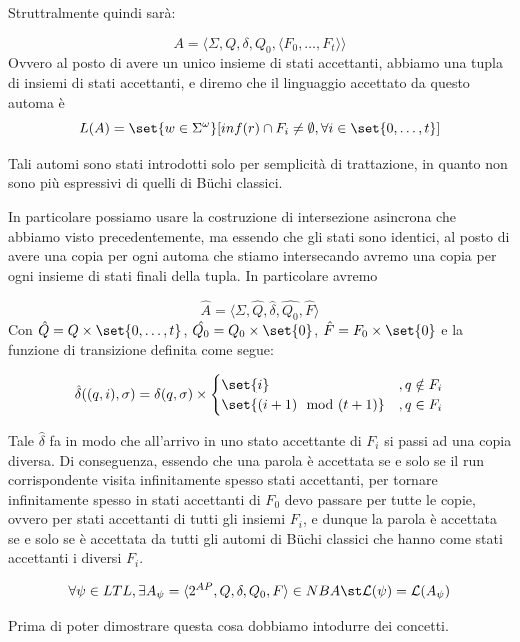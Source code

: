 Struttralmente quindi sarà:

\[A = \langle\Sigma,Q,\delta,Q_0,\langle F_0, \ldots,F_t\rangle\rangle\]
Ovvero al posto di avere un unico insieme di stati accettanti, abbiamo una tupla di insiemi di stati accettanti, e diremo che il linguaggio accettato da questo automa è
\[L(A)= \set{w\in\Sigma^\omega}[inf(r) \cap F_i \neq \emptyset, \forall i \in \set{0,\ldots,t}]\]

Tali automi sono stati introdotti solo per semplicità di trattazione, in quanto non sono più espressivi di quelli di Büchi classici.

In particolare possiamo usare la costruzione di intersezione asincrona che abbiamo visto precedentemente, ma essendo che gli stati sono identici, al posto di avere una copia per ogni automa che stiamo intersecando avremo una copia per ogni insieme di stati finali della tupla. In particolare avremo

\[\hat{A} = \langle\Sigma, \hat{Q},\hat{\delta},\hat{Q_0},\hat{F}\rangle\]
Con \(\hat{Q}=Q\times\set{0,\ldots,t}\), \(\hat{Q_0}=Q_0\times\set{0}\), \(\hat{F}=F_0\times\set{0}\) e la funzione di transizione definita come segue:

\[\hat{\delta}((q,i),\sigma) = \delta(q,\sigma) \times \begin{cases}
    \set{i}                & ,q\notin F_i \\
    \set{(i+1) \mod (t+1)} & ,q\in F_i
  \end{cases}\]

Tale \(\hat{\delta}\) fa in modo che all'arrivo in uno stato accettante di \(F_i\) si passi ad una copia diversa. Di conseguenza, essendo che una parola è accettata se e solo se il run corrispondente visita infinitamente spesso stati accettanti, per tornare infinitamente spesso in stati accettanti di \(F_0\) devo passare per tutte le copie, ovvero per stati accettanti di tutti gli insiemi \(F_i\), e dunque la parola è accettata se e solo se è accettata da tutti gli automi di Büchi classici che hanno come stati accettanti i diversi \(F_i\).

\begin{theorem}{}
  \[\forall \psi \in LTL, \exists A_\psi = \langle 2^{AP}, Q, \delta,Q_0,F\rangle \in NBA \st \mathcal{L}(\psi) = \mathcal{L}(A_\psi)\]
\end{theorem}

Prima di poter dimostrare questa cosa dobbiamo intodurre dei concetti.


